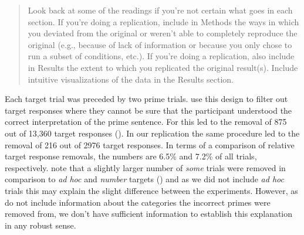 \documentclass[10pt]{article}
\begin{document}
\begin{multicols}{2}
\begin{quote}
  Look back at some of the readings if you're not certain what goes in each section. If you're doing a replication, include in Methods the ways in which you deviated from the original or weren't able to completely reproduce the original (e.g., because of lack of information or because you only chose to run a subset of conditions, etc.). If you're doing a replication, also include in Results the extent to which you replicated the original result(s). Include intuitive visualizations of the data in the Results section.
\end{quote}

Each target trial was preceded by two prime trials.
\citeauthor{Bott:2016aa} use this design to filter out target responses where they cannot be sure that the participant understood the correct interpretation of the prime sentence.
For \citeauthor{Bott:2016aa} this led to the removal of 875 out of 13,360 target responses (\citeyear[124]{Bott:2016aa}).
In our replication the same procedure led to the removal of 216 out of 2976 target responses.
In terms of a comparison of relative target response removals, the numbers are 6.5\% and 7.2\% of all trials, respectively.
\citeauthor{Bott:2016aa} note that a slightly larger number of \emph{some} trials were removed in comparison to \emph{ad hoc} and \emph{number} targets (\citeyear[124]{Bott:2016aa}) and as we did not include \emph{ad hoc} trials this may explain the slight difference between the experiments.
However, as \citeauthor{Bott:2016aa} do not include information about the categories the incorrect primes were removed from, we don't have sufficient information to establish this explanation in any robust sense.




\end{multicols}
\end{document}
